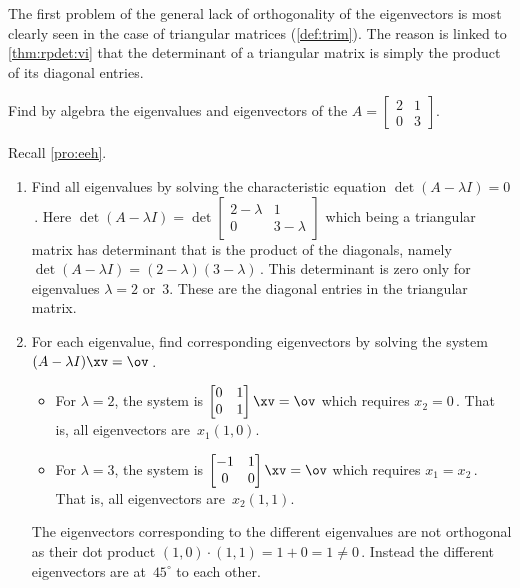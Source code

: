 The first problem of the general lack of orthogonality of the eigenvectors is most clearly seen in the case of triangular matrices (\autoref{def:trim}).
The reason is  linked to \autoref{thm:rpdet:vi} that the determinant of a triangular matrix is simply the product of its diagonal entries.

\begin{example} \label{eg:}
Find by algebra the eigenvalues and eigenvectors of the  \(A=\begin{bmatrix} 2&1\\0&3 \end{bmatrix}\).
\begin{solution} 
Recall \autoref{pro:eeh}. 
\begin{enumerate}
\item Find all eigenvalues by solving the characteristic equation \(\det(A-\lambda I)=0\)\,. 
Here \(\det(A-\lambda I)=\det\begin{bmatrix} 2-\lambda&1\\0&3-\lambda \end{bmatrix}\) which being a triangular matrix has determinant that is the product of the diagonals, namely \(\det(A-\lambda I)=(2-\lambda)(3-\lambda)\)\,.
This determinant is zero only for eigenvalues \(\lambda=2\) or~\(3\).
These are the diagonal entries in the triangular matrix.
\item For each eigenvalue, find corresponding eigenvectors by solving the system \((A-\lambda I)\xv=\ov\)\,.
\begin{itemize}
\item For \(\lambda=2\), the system is \(\begin{bmatrix} 0&1\\0&1 \end{bmatrix}\xv=\ov\) which requires \(x_2=0\)\,.  That is, all eigenvectors are~\(x_1(1,0)\).
\item For \(\lambda=3\), the system is \(\begin{bmatrix} -1&1\\0&0 \end{bmatrix}\xv=\ov\) which requires \(x_1=x_2\)\,.  That is, all eigenvectors are~\(x_2(1,1)\).
\end{itemize}
The eigenvectors corresponding to the different eigenvalues are not orthogonal as their dot product \((1,0)\cdot(1,1)=1+0=1\neq 0\)\,. 
Instead the different eigenvectors are at~\(45^\circ\) to each other.
\end{enumerate}
\end{solution}
\end{example}



